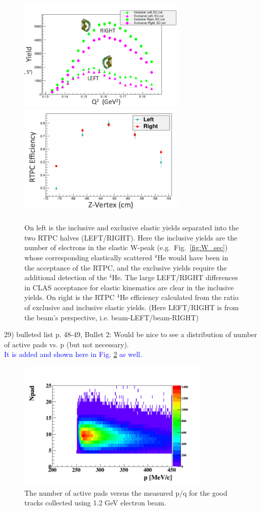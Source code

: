 \begin{figure}[tbp]\centering
  \includegraphics[width=8cm]{fig/tpceffyields.png}
  \includegraphics[width=8cm]{fig/tpceff.png}
  \caption{On left is the inclusive and exclusive elastic yields separated into 
     the two RTPC halves (LEFT/RIGHT).  Here the inclusive yields are the 
     number of electrons in the elastic W-peak (e.g.\ Fig.~\ref{fig:W_sec}) 
     whose corresponding elastically scattered $^4$He would have been in the 
     acceptance of the RTPC, and the exclusive yields require the additional 
     detection of the $^4$He.  The large LEFT/RIGHT differences in CLAS 
     acceptance for elastic kinematics are clear in the inclusive yields.  On 
     right is the RTPC $^4$He efficiency calculated from the ratio of exclusive 
     and inclusive elastic yields.  (Here LEFT/RIGHT is from the beam's 
     perspective, i.e.  beam-LEFT/beam-RIGHT)\label{fig:tpceff}}
\end{figure}

29) bulleted list p. 48-49, Bullet 2: Would be nice to see a distribution of 
number of active pads vs. p (but not necessary).\\
\textcolor{blue}{It is added and shown here in Fig. \ref{fig:padnb} as well.}\\

\begin{figure}[tbp]
\centering
\includegraphics[height=6.2cm]{fig/npd_p_elastic.png}
\caption{The number of active pads versus the measured p/q for the good tracks 
collected using 1.2 GeV electron beam.}
\label{fig:padnb}
\end{figure}

